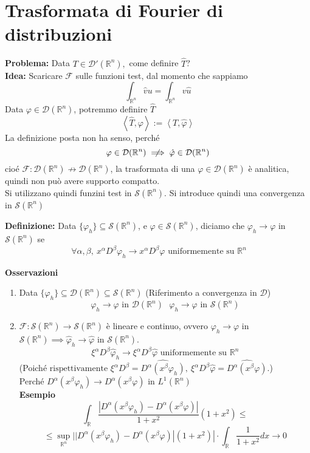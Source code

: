 \documentclass[a4paper]{article}
\newcommand{\R}{\mathbb{R}}
\begin{document}
\section{Trasformata di Fourier di distribuzioni}
\textbf{Problema:} Data $T\in \mathcal D'(\R^n),$ come definire $\hat{T}$?
\\\textbf{Idea:} Scaricare $\mathcal F$ sulle funzioni test, dal momento che sappiamo 
\[\int_{\R^n}^{} \hat{v}u=\int_{\R^n}^{} v\hat{u}  \]
Data $\varphi \in \mathcal D(\R^n)$, potremmo definire $\hat{T}$ 
\[ \left< \hat{T},\varphi \right> := \left< T,\hat{\varphi} \right> \]
La definizione posta non ha senso, perché
\[\varphi \in \mathcal D(\R^n) \centernot\implies \hat{\varphi}\in \mathcal D(\R^n)\]
cioé $\mathcal F:\mathcal D(\R^n)\not \to \mathcal D(\R^n)$, la trasformata di una $\varphi \in \mathcal D(\R^n) $ è analitica, quindi non può avere supporto compatto.
\\Si utilizzano quindi funzini test in $\mathcal S(\R^n)$. Si introduce quindi una convergenza in $\mathcal S(\R^n)$
\begin{tcolorbox}
	\textbf{Definizione: }Data $\{\varphi_h\} \subseteq  \mathcal S(\R^n)$, e $\varphi \in \mathcal S(\R^n)$, diciamo che $\varphi_h\to \varphi$ in $\mathcal S(\R^n)$ se 
	\[\ \forall \alpha,\beta,\ x^\alpha D^\beta \varphi_h\to x^\alpha D^\beta \varphi\text{ uniformemente su }\R^n\]
\end{tcolorbox}
\textbf{Osservazioni} 
\begin{enumerate}
	\item Data $\{\varphi_h\} \subseteq  \mathcal D(\R^n)\subseteq  \mathcal S(\R^n)$ (Riferimento a convergenza in $\mathcal D$)
		\[\varphi_h\to \varphi\text{ in }\mathcal D(\R^n)\ \ \ \varphi_h\to \varphi\text{ in }\mathcal S(\R^n)\]
	\item $\mathcal F:\mathcal S(\R^n)\to \mathcal S(\R^n)$ è lineare e continuo, ovvero $\varphi_h\to \varphi$ in $\mathcal S(\R^n)\implies \hat{\varphi}_h\to \hat{\varphi}$ in $\mathcal S(\R^n)$.
		\[\xi^\alpha D^\beta \hat{\varphi}_h\to \xi ^\alpha D^\beta \hat{\varphi}\text{ uniformemente su }\R^n\]
		(Poiché $\text{rispettivamente } \xi^\alpha D^\beta =\widehat{D^\alpha (x^\beta \varphi_h)},\ \xi^\alpha D^\beta \hat{\varphi}=\widehat{D^\alpha (x^\beta \varphi)}.$)\\
	Perché $D^\alpha (x^\beta \varphi_h)\to D^\alpha (x^\beta \varphi)$ in $L^{1}(\R^n)$\\
	\textbf{Esempio} 
	\[\int_{\R}^{}  \frac{|D^\alpha(x^\beta\varphi_h)-D^\alpha (x^\beta \varphi)|}{1+x^2}(1+x^2)\le \]\[\le \sup_{\R^n} | |D^\alpha(x^\beta \varphi_h)-D^\alpha(x^\beta \varphi)|(1+x^2)|\cdot \int_{\R}^{}  \frac{1}{1+x^2}dx\to 0\] 

\end{enumerate}
\end{document}
